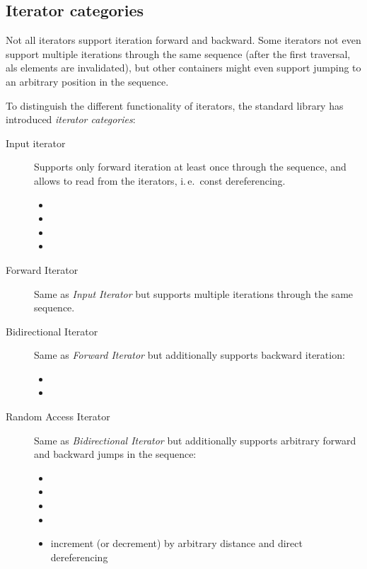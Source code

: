 \subsection{Iterator categories}
Not all iterators support iteration forward and backward. Some iterators not even support multiple iterations through the same sequence
(after the first traversal, als elements are invalidated), but other containers might even support jumping to an arbitrary position in the
sequence.

To distinguish the different functionality of iterators, the standard library has introduced \emph{iterator categories}:
\begin{description}
  \item[Input iterator]
    Supports only forward iteration at least once through the sequence, and allows to read from the iterators, i.\,e.\ const dereferencing.
    \begin{itemize}
      \item {}
      \item {}
      \item {}
      \item {}
    \end{itemize}
  \item[Forward Iterator]
    Same as \emph{Input Iterator} but supports multiple iterations through the same sequence.
  \item[Bidirectional Iterator]
    Same as \emph{Forward Iterator} but additionally supports backward iteration:
    \begin{itemize}
      \item {}
      \item {}
    \end{itemize}
  \item[Random Access Iterator]
    Same as \emph{Bidirectional Iterator} but additionally supports arbitrary forward and backward jumps in the sequence:
    \begin{itemize}
      \item {}
      \item {}
      \item {}
      \item {}
      \item {} increment (or decrement) by arbitrary distance and direct dereferencing

\end{itemize}
\end{description}

